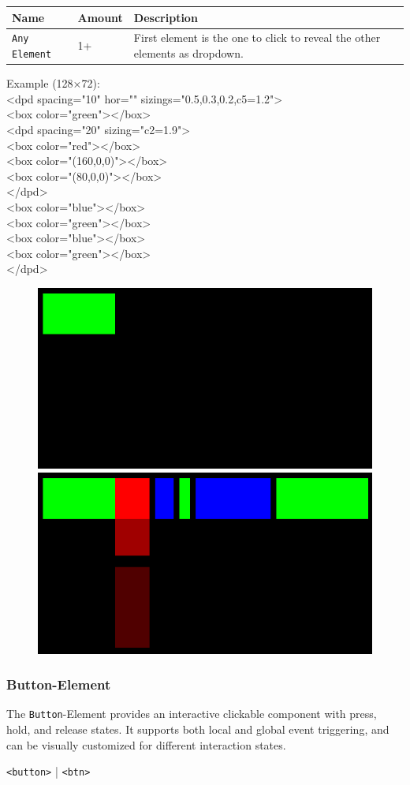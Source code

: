 \documentclass[a4paper,11pt]{article}
\begin{document}
\renewcommand{\arraystretch}{1.3}
\begin{tcolorbox}[colback=white, colframe=black!75, title=Children]
\begin{tabularx}{\linewidth}{p{50pt}|p{110pt}|X}
\textbf{Name} & \textbf{Amount} & \textbf{Description}\\
\hline
\texttt{Any Element} & 1+ & First element is the one to click to reveal the other elements as dropdown.\\
\end{tabularx}
\end{tcolorbox}

Example (128×72):\\
<dpd spacing="10" hor="" sizings="0.5,0.3,0.2,c5=1.2">\\
<box color="green"></box>\\
<dpd spacing="20" sizing="c2=1.9">\\
<box color="red"></box>\\
<box color="(160,0,0)"></box>\\
<box color="(80,0,0)"></box>\\
</dpd>\\
<box color="blue"></box>\\
<box color="green"></box>\\
<box color="blue"></box>\\
<box color="green"></box>\\
</dpd>

\begin{figure}[h]
    \centering
    \includegraphics[width=0.45\linewidth]{images/dropdown1.png}
    \includegraphics[width=0.45\linewidth]{images/dropdown2.png}
\end{figure}
\newpage
\hypertarget{button}{}
\subsubsection*{Button-Element}
The \texttt{Button}-Element provides an interactive clickable component with press, hold, and release states. It supports both local and global event triggering, and can be visually customized for different interaction states.
\begin{center}
        	\texttt{<button>} | \texttt{<btn>}
\end{center}
\end{document}
